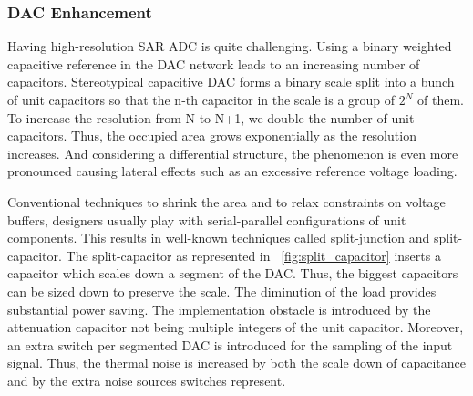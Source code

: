 \subsubsection{DAC Enhancement}
Having high-resolution SAR ADC is quite challenging. Using a binary weighted capacitive reference in the DAC network leads to an increasing number of capacitors. Stereotypical capacitive DAC forms a binary scale split into a bunch of unit capacitors so that the n-th capacitor in the scale is a group of \(2^N\) of them. To increase the resolution from N to N+1, we double the number of unit capacitors. Thus, the occupied area grows exponentially as the resolution increases. And considering a differential structure, the phenomenon is even more pronounced causing lateral effects such as an excessive reference voltage loading.

Conventional techniques to shrink the area and to relax constraints on voltage buffers, designers usually play with serial-parallel configurations of unit components. This results in well-known techniques called split-junction and split-capacitor. The split-capacitor as represented in \figurename~\ref{fig:split_capacitor} inserts a capacitor which scales down a segment of the DAC\@. Thus, the biggest capacitors can be sized down to preserve the scale. The diminution of the load provides substantial power saving. The implementation obstacle is introduced by the attenuation capacitor not being multiple integers of the unit capacitor. Moreover, an extra switch per segmented DAC is introduced for the sampling of the input signal. Thus, the thermal noise is increased by both the scale down of capacitance and by the extra noise sources switches represent.


